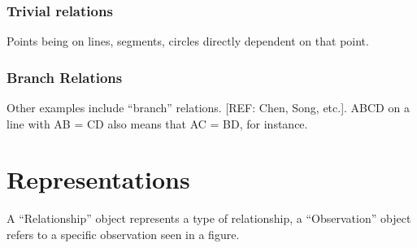 \subsubsection{Trivial relations}

Points being on lines, segments, circles directly dependent on that point.

\subsubsection{Branch Relations}

Other examples include ``branch'' relations. [REF: Chen, Song,
  etc.]. ABCD on a line with AB = CD also means that AC = BD, for instance.

\section{Representations}

A ``Relationship'' object represents a type of relationship, a
``Observation'' object refers to a specific observation seen in a
figure.

\fi
